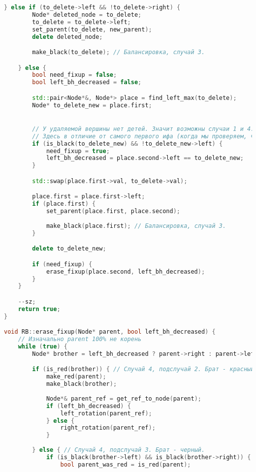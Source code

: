 \begin{lstlisting}[language=C++]
    } else if (to_delete->left && !to_delete->right) { 
        Node* deleted_node = to_delete;
        to_delete = to_delete->left;
        set_parent(to_delete, new_parent);
        delete deleted_node;

        make_black(to_delete); // Балансировка, случай 3.

    } else {
        bool need_fixup = false;
        bool left_bh_decreased = false;

        std::pair<Node*&, Node*> place = find_left_max(to_delete);
        Node* to_delete_new = place.first;


        // У удаляемой вершины нет детей. Значит возможны случаи 1 и 4.
        // Здесь в отличие от самого первого ифа (когда мы проверяем, что нет детей вообще) всегда будет родитель.
        if (is_black(to_delete_new) && !to_delete_new->left) {
            need_fixup = true;
            left_bh_decreased = place.second->left == to_delete_new;
        }

        std::swap(place.first->val, to_delete->val);

        place.first = place.first->left;
        if (place.first) {
            set_parent(place.first, place.second);
            
            make_black(place.first); // Балансировка, случай 3.
        }

        delete to_delete_new;

        if (need_fixup) {
            erase_fixup(place.second, left_bh_decreased);
        }
    }

    --sz;
    return true;
}

void RB::erase_fixup(Node* parent, bool left_bh_decreased) {
    // Изначально parent 100% не корень
    while (true) {
        Node* brother = left_bh_decreased ? parent->right : parent->left;

        if (is_red(brother)) { // Случай 4, подслучай 2. Брат - красный.
            make_red(parent);
            make_black(brother);
            
            Node*& parent_ref = get_ref_to_node(parent);
            if (left_bh_decreased) {
                left_rotation(parent_ref);
            } else {
                right_rotation(parent_ref);
            }
        
        } else { // Случай 4, подслучай 3. Брат - черный.
            if (is_black(brother->left) && is_black(brother->right)) { // Подслучай 3.1
                bool parent_was_red = is_red(parent);
                

\end{lstlisting}
